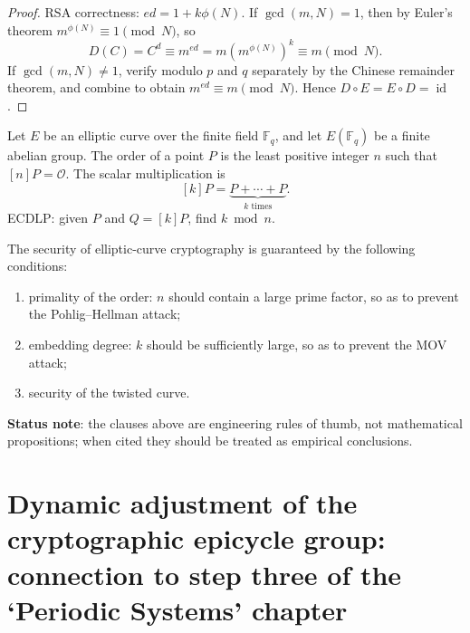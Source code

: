 \begin{proof}
RSA correctness: \(ed=1+k\phi(N)\). If \(\gcd(m,N)=1\), then by Euler's theorem \(m^{\phi(N)}\equiv1\pmod N\), so
\[
D(C)=C^d\equiv m^{ed}=m(m^{\phi(N)})^k\equiv m\pmod N.
\]
If \(\gcd(m,N)\neq1\), verify modulo \(p\) and \(q\) separately by the Chinese remainder theorem, and combine to obtain \(m^{ed}\equiv m\pmod N\). Hence \(D\circ E=E\circ D=\operatorname{id}\).
\end{proof}

\begin{definition}\label{def:elliptic_curve_period}
Let \(E\) be an elliptic curve over the finite field \(\mathbb F_q\), and let \(E(\mathbb F_q)\) be a finite abelian group. The order of a point \(P\) is the least positive integer \(n\) such that \([n]P=\mathcal O\). The scalar multiplication is
\[
[k]P=\underbrace{P+\cdots+P}_{k\text{ times}}.
\]
ECDLP: given \(P\) and \(Q=[k]P\), find \(k\bmod n\).
\end{definition}

\begin{remark}\label{prop:ecc_security}
The security of elliptic-curve cryptography is guaranteed by the following conditions:
\begin{enumerate}[label=(\roman*)]
    \item primality of the order: \(n\) should contain a large prime factor, so as to prevent the Pohlig--Hellman attack;
    \item embedding degree: \(k\) should be sufficiently large, so as to prevent the MOV attack;
    \item security of the twisted curve.
\end{enumerate}
\textbf{Status note}: the clauses above are engineering rules of thumb, not mathematical propositions; when cited they should be treated as empirical conclusions.
\end{remark}

\section{Dynamic adjustment of the cryptographic epicycle group: connection to step three of the `Periodic Systems' chapter}
\label{sec:crypto_adaptive}

